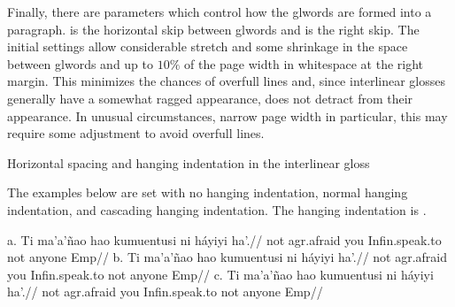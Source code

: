 Finally, there are parameters which control how the glwords are formed
into a paragraph.   is the horizontal skip between
glwords and  is the right skip.  The initial
settings allow considerable stretch and some shrinkage in the space between
glwords and up to $10\%$ of the page width in whitespace at the right
margin.  This minimizes the chances of overfull lines and, since
interlinear glosses generally have a somewhat ragged appearance, does
not detract from their appearance.  In unusual circumstances, narrow
page width in particular, this may require some adjustment to avoid
overfull lines.

\ex[dima=2em] Horizontal spacing and hanging indentation
in the interlinear gloss
\smallskip
\quad
{}\xe

The examples below are set with no hanging indentation, normal
hanging indentation, and cascading hanging indentation.  The hanging
indentation is \textdim{1 em}.

\ex[glrightskip=0pt plus .5in,glwidth=1.4in]
a.\quad
\begingl[glhangstyle=none]
\gla Ti ma'a'\~nao hao kumuentusi
   ni h\'ayiyi ha'.//
\glb not agr.afraid you
   Infin.speak.to not anyone Emp//
\endgl
\hfil
b.\quad
\begingl[glhangstyle=normal]
\gla Ti ma'a'\~nao hao kumuentusi
   ni h\'ayiyi ha'.//
\glb not agr.afraid you
   Infin.speak.to not anyone Emp//
\endgl
\hfil
c.\quad
\begingl[glhangstyle=cascade]
\gla Ti ma'a'\~nao hao kumuentusi
   ni h\'ayiyi ha'.//
\glb not agr.afraid you
   Infin.speak.to not anyone Emp//
\endgl
\xe






